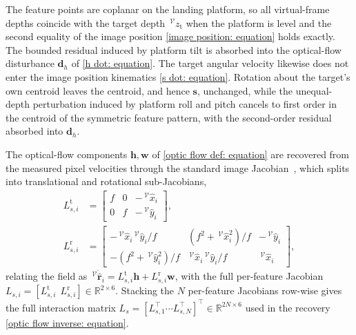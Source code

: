 \documentclass{IEEEtaes}
\begin{document}
The feature points are coplanar on the landing platform, so all virtual-frame depths coincide with the target depth $\,^\mathcal{V}z_\text{t}$ when the platform is level and the second equality of the image position \eqref{image position: equation} holds exactly. The bounded residual induced by platform tilt is absorbed into the optical-flow disturbance $\boldsymbol{d}_h$ of \eqref{h dot: equation}. The target angular velocity likewise does not enter the image position kinematics \eqref{s dot: equation}. Rotation about the target's own centroid leaves the centroid, and hence $\boldsymbol{s}$, unchanged, while the unequal-depth perturbation induced by platform roll and pitch cancels to first order in the centroid of the symmetric feature pattern, with the second-order residual absorbed into $\boldsymbol{d}_h$.

The optical-flow components $\boldsymbol{h},\boldsymbol{w}$ of \eqref{optic flow def: equation} are recovered from the measured pixel velocities through the standard image Jacobian~\cite{chaumette2006}, which splits into translational and rotational sub-Jacobians,
\begin{align} \label{interaction matrix: equation}
L_{s,i}^\text{t} &= \begin{bmatrix} f & 0 & -\,^\mathcal{V}\hat{x}_i \\ 0 & f & -\,^\mathcal{V}\hat{y}_i \end{bmatrix},\nonumber\\
L_{s,i}^\text{r} &= \begin{bmatrix} -\,^\mathcal{V}\hat{x}_i\,^\mathcal{V}\hat{y}_i/f & (f^2+\,^\mathcal{V}\hat{x}_i^2)/f & -\,^\mathcal{V}\hat{y}_i \\ -(f^2+\,^\mathcal{V}\hat{y}_i^2)/f & \,^\mathcal{V}\hat{x}_i\,^\mathcal{V}\hat{y}_i/f & \,^\mathcal{V}\hat{x}_i \end{bmatrix},
\end{align}
relating the field as $\,^\mathcal{V}\dot{\hat{\boldsymbol{r}}}_i = L_{s,i}^\text{t}\boldsymbol{h} + L_{s,i}^\text{r}\boldsymbol{w}$, with the full per-feature Jacobian $L_{s,i}=[L_{s,i}^\text{t}~~L_{s,i}^\text{r}]\in\mathbb{R}^{2\times 6}$. Stacking the $N$ per-feature Jacobians row-wise gives the full interaction matrix $L_s=[L_{s,1}^\top \cdots L_{s,N}^\top]^\top\in\mathbb{R}^{2N\times 6}$ used in the recovery \eqref{optic flow inverse: equation}.
\end{document}
